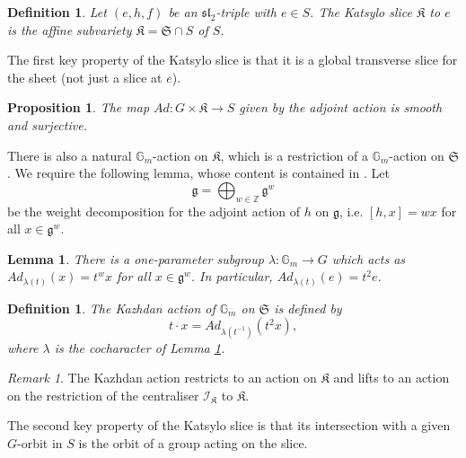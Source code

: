 \documentclass{amsart}
\newtheorem{lemma}[theorem]{Lemma}
\newtheorem{proposition}[theorem]{Proposition}
\newtheorem{definition}[theorem]{Definition}
\theoremstyle{remark}
\newtheorem{remark}[theorem]{Remark}
\numberwithin{theorem}{section}
\numberwithin{equation}{section}
\begin{document}
\begin{definition}\label{KatsyloSlicedef}\cite{Katsylo}
    Let $(e,h,f)$ be an $\mathfrak{sl}_2$-triple with $e \in S$. The \emph{Katsylo slice} $\mathfrak{K}$ to $e$ is the affine subvariety $\mathfrak{K} = \mathfrak{S} \cap S$ of $S$.
\end{definition}

The first key property of the Katsylo slice is that it is a global transverse slice for the sheet (not just a slice at $e$).

\begin{proposition}\cite[Theorem 0.1]{Katsylo}\label{KatsyloSliceprp}
    The map $Ad:G \times \mathfrak{K} \rightarrow S$ given by the adjoint action is smooth and surjective.
\end{proposition}

There is also a natural $\mathbb{G}_m$-action on $\mathfrak{K}$, which is a restriction of a $\mathbb{G}_m$-action on $\mathfrak{S}$. We require the following lemma, whose content is contained in \cite[Sections 7.3 \& 7.4]{Slodowy}. Let 
\begin{equation}\label{WtDecompositioneqn}
    \mathfrak{g} = \bigoplus_{w \in \mathbb{Z}} \mathfrak{g}^w
\end{equation}
be the weight decomposition for the adjoint action of $h$ on $\mathfrak{g}$, i.e. $[h,x] = wx$ for all $x \in \mathfrak{g}^w$.

\begin{lemma}\cite{Slodowy}\label{KazhdanActionlem}
    There is a one-parameter subgroup $\lambda:\mathbb{G}_m \rightarrow G$ which acts as $Ad_{\lambda(t)}(x) = t^wx$ for all $x \in \mathfrak{g}^w$. In particular, $Ad_{\lambda(t)}(e)=t^2e$.
\end{lemma}

\begin{definition}\label{KazhdanActiondef}
    The \emph{Kazhdan action} of $\mathbb{G}_m$ on $\mathfrak{S}$ is defined by
    $$t \cdot x = Ad_{\lambda(t^{-1})}(t^2x),$$
    where $\lambda$ is the cocharacter of Lemma \ref{KazhdanActionlem}.
\end{definition}

\begin{remark}\label{KatsyloActionsrmk}
    The Kazhdan action restricts to an action on $\mathfrak{K}$ and lifts to an action on the restriction of the centraliser $\mathcal I_{\mathfrak{K}}$ to $\mathfrak{K}$.
\end{remark}

The second key property of the Katsylo slice is that its intersection with a given $G$-orbit in $S$ is the orbit of a group acting on the slice.
\end{document}
